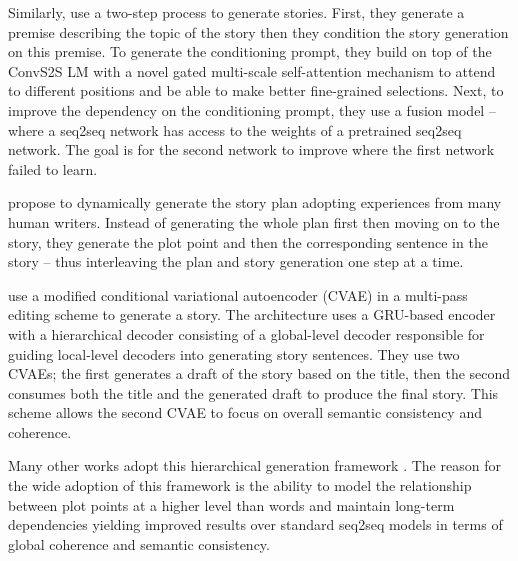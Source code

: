 Similarly, \citep{fan2018hierarchical} use a two-step process to generate stories. First, they generate a premise describing the topic of the story then they condition the story generation on this premise. To generate the conditioning prompt, they build on top of the ConvS2S \citep{gehring2017convolutional} LM with a novel gated multi-scale self-attention mechanism to attend to different positions and be able to make better fine-grained selections. Next, to improve the dependency on the conditioning prompt, they use a fusion model -- where a seq2seq network has access to the weights of a pretrained seq2seq network. The goal is for the second network to improve where the first network failed to learn.

\citep{yao2019plan} propose to dynamically generate the story plan adopting experiences from many human writers. Instead of generating the whole plan first then moving on to the story, they generate the plot point and then the corresponding sentence in the story -- thus interleaving the plan and story generation one step at a time.

\citep{yu2020draft} use a modified conditional variational autoencoder (CVAE) in a multi-pass editing scheme to generate a story. The architecture uses a GRU-based encoder with a hierarchical decoder consisting of a global-level decoder responsible for guiding local-level decoders into generating story sentences. They use two CVAEs; the first generates a draft of the story based on the title, then the second consumes both the title and the generated draft to produce the final story. This scheme allows the second CVAE to focus on overall semantic consistency and coherence.

Many other works adopt this hierarchical generation framework \citep{ammanabrolu2019guided, fan2019strategies, zhai2019hybrid, ammanabrolu2020story}. The reason for the wide adoption of this framework is the ability to model the relationship between plot points at a higher level than words and maintain long-term dependencies yielding improved results over standard seq2seq models in terms of global coherence and semantic consistency.


